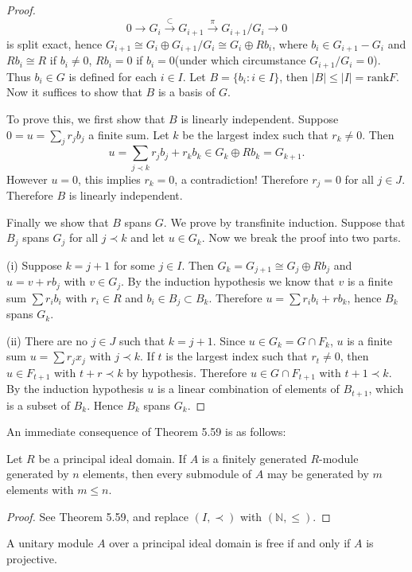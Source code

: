 \begin{proof}
$$
0\longrightarrow G_i\overset{\subset}{\longrightarrow}G_{i+1}\overset{\pi}{\longrightarrow}G_{i+1}/G_i\longrightarrow 0
$$
is split exact, hence $G_{i+1}\cong G_i\oplus G_{i+1}/G_i\cong G_i\oplus Rb_i$, where $b_i\in G_{i+1}-G_i$ and $Rb_i\cong R$ if $b_i\ne 0$, $Rb_i=0$ if $b_i=0$(under which circumstance $G_{i+1}/G_i=0$). Thus $b_i\in G$ is defined for each $i\in I$. Let $B=\{b_i:i\in I\}$, then $|B|\le|I|=\mathrm{rank}F$. Now it suffices to show that $B$ is a basis of $G$.\par
To prove this, we first show that $B$ is linearly independent. Suppose $0=u=\sum_jr_jb_j$ a finite sum. Let $k$ be the largest index such that $r_k\ne 0$. Then 
$$
u=\sum_{j\prec k}{r_jb_j}+r_kb_k\in G_k\oplus Rb_k=G_{k+1}.
$$
However $u=0$, this implies $r_k=0$, a contradiction! Therefore $r_j=0$ for all $j\in J$. Therefore $B$ is linearly independent.\par
Finally we show that $B$ spans $G$. We prove by transfinite induction. Suppose that $B_j$ spans $G_j$ for all $j\prec k$ and let $u\in G_k$. Now we break the proof into two parts.\par
(i) Suppose $k=j+1$ for some $j\in I$. Then $G_k=G_{j+1}\cong G_j\oplus Rb_j$ and $u=v+rb_j$ with $v\in G_j$. By the induction hypothesis we know that $v$ is a finite sum $\sum r_ib_i$ with $r_i\in R$ and $b_i\in B_j\subset B_k$. Therefore $u=\sum r_ib_i+rb_k$, hence $B_k$ spans $G_k$.\par
(ii) There are no $j\in J$ such that $k=j+1$. Since $u\in G_k=G\cap F_k$, $u$ is a finite sum $u=\sum r_jx_j$ with $j\prec k$. If $t$ is the largest index such that $r_t\ne 0$, then $u\in F_{t+1}$ with $t+r\prec k$ by hypothesis. Therefore $u\in G\cap F_{t+1}$ with $t+1\prec k$. By the induction hypothesis $u$ is a linear combination of elements of $B_{t+1}$, which is a subset of $B_k$. Hence $B_k$ spans $G_k$.
\end{proof}
An immediate consequence of Theorem 5.59 is as follows: 
\begin{corollary}
Let $R$ be a principal ideal domain. If $A$ is a finitely generated $R$-module generated by $n$ elements, then every submodule of $A$ may be generated by $m$ elements with $m\le n$.
\end{corollary}
\begin{proof}
See Theorem 5.59, and replace $(I,\prec)$ with $(\mathbb{N},\le)$.
\end{proof}
\begin{corollary}
A unitary module $A$ over a principal ideal domain is free if and only if $A$ is projective.
\end{corollary}
